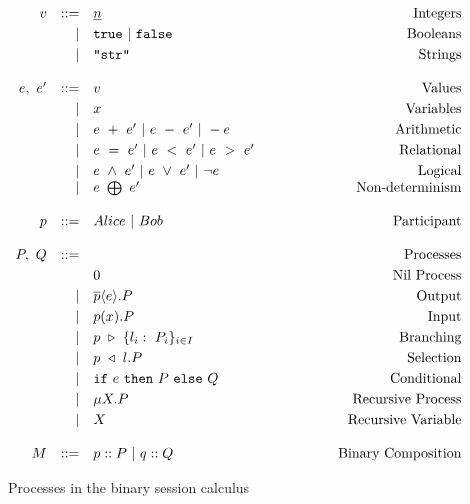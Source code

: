 \documentclass[12pt,twoside]{report}
\newcommand{\white}{\ \ \ \ \ \ \ \ \ \ \ \ }
\begin{document}
\begin{figure}[h]
    \centering
    \begin{equation*}
    \centering
    \begin{array}{rrlcr}
        v & ::= & \underline{n} & \white & \text{Integers} \\[2.75pt]
              & |  & \texttt{true}\ |\ \texttt{false} & \white & \text{Booleans} \\[2.75pt]
              & | & \texttt{"str"} & \white & \text{Strings} \\\\
        e,\ e' & ::= & v & \white & \text{Values} \\[2.75pt]
              & |  & x & \white & \text{Variables} \\[2.75pt]
              & | & e\ +\ e'\ |\ e\ -\ e'\ |\ -e & \white & \text{Arithmetic} \\[2.75pt]
              & | & e\ =\ e'\ |\ e\ <\ e'\ |\ e\ >\ e' & \white & \text{Relational} \\[2.75pt]
              & | & e\ \land\ e'\ |\ e\ \lor\ e'\ |\ \lnot e & \white & \text{Logical} \\
              & | & e\ \bigoplus\ e' & \white & \text{Non-determinism}\\\\
        
        
        p & ::= & Alice\ |\ Bob & \white & \text{Participant}\\\\
        P,\ Q & ::= && \white & \text{Processes} \\[2.75pt]
             &   & 0 & \white & \text{Nil\ Process}  \\[2.75pt]
             & | & \overline{p} \langle e \rangle.P & \white & \text{Output} \\[2.75pt] 
             & | & p(x).P & \white & \text{Input}\\[2.75pt]
             & | & p\ \triangleright\ \{l_i:\ P_i\}_{i\in I}& \white & \text{Branching}\\[2.75pt]
             & | & p\ \triangleleft\ l.P& \white & \text{Selection} \\[2.75pt]
             & | & \texttt{if}\ e\ \texttt{then}\ P\ \texttt{else}\ Q & \white & \text{Conditional} \\[2.75pt]
             & | & \mu X.P & \white  & \text{Recursive}\ \text{Process} \\[2.75pt]
             & | & X & \white  & \text{Recursive\ Variable} \\\\
             
        M & ::= & p :: P\ |\ q :: Q & \white & \text{Binary\ Composition}
        \end{array}
    \end{equation*}
    \caption{Processes in the binary session calculus}
    \label{bst_session_calc}
\end{figure}{}
\end{document}
